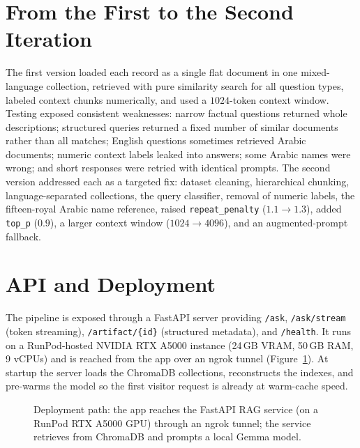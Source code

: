 \section{From the First to the Second Iteration}

The first version loaded each record as a single flat document in one mixed-language
collection, retrieved with pure similarity search for all question types, labeled
context chunks numerically, and used a $1024$-token context window. Testing exposed
consistent weaknesses: narrow factual questions returned whole descriptions; structured
queries returned a fixed number of similar documents rather than all matches; English
questions sometimes retrieved Arabic documents; numeric context labels leaked into
answers; some Arabic names were wrong; and short responses were retried with identical
prompts. The second version addressed each as a targeted fix: dataset cleaning,
hierarchical chunking, language-separated collections, the query classifier, removal of
numeric labels, the fifteen-royal Arabic name reference, raised
\texttt{repeat\_penalty} ($1.1\rightarrow1.3$), added \texttt{top\_p} ($0.9$), a larger
context window ($1024\rightarrow4096$), and an augmented-prompt fallback.

\section{API and Deployment}

The pipeline is exposed through a FastAPI server providing \texttt{/ask},
\texttt{/ask/stream} (token streaming), \texttt{/artifact/\{id\}} (structured metadata),
and \texttt{/health}. It runs on a RunPod-hosted NVIDIA RTX A5000 instance (24\,GB
VRAM, 50\,GB RAM, 9 vCPUs) and is reached from the app over an
ngrok tunnel (Figure~\ref{fig:deploy}). At startup the server loads the ChromaDB
collections, reconstructs the indexes, and pre-warms the model so the first visitor
request is already at warm-cache speed.

\begin{figure}[htbp]
\centering
{}
\caption{Deployment path: the app reaches the FastAPI RAG service (on a RunPod
RTX A5000 GPU) through an ngrok tunnel; the service retrieves from ChromaDB and
prompts a local Gemma model.}
\label{fig:deploy}
\end{figure}

